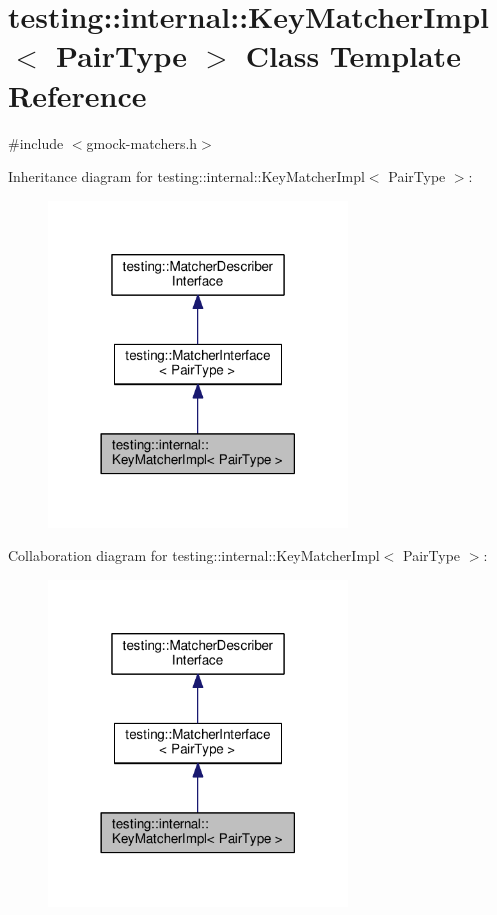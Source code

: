 \hypertarget{classtesting_1_1internal_1_1KeyMatcherImpl}{}\section{testing\+:\+:internal\+:\+:Key\+Matcher\+Impl$<$ Pair\+Type $>$ Class Template Reference}
\label{classtesting_1_1internal_1_1KeyMatcherImpl}


{\ttfamily \#include $<$gmock-\/matchers.\+h$>$}



Inheritance diagram for testing\+:\+:internal\+:\+:Key\+Matcher\+Impl$<$ Pair\+Type $>$\+:\nopagebreak
\begin{figure}[H]
\begin{center}
\leavevmode
\includegraphics[width=225pt]{classtesting_1_1internal_1_1KeyMatcherImpl__inherit__graph}
\end{center}
\end{figure}


Collaboration diagram for testing\+:\+:internal\+:\+:Key\+Matcher\+Impl$<$ Pair\+Type $>$\+:\nopagebreak
\begin{figure}[H]
\begin{center}
\leavevmode
\includegraphics[width=225pt]{classtesting_1_1internal_1_1KeyMatcherImpl__coll__graph}
\end{center}
\end{figure}
